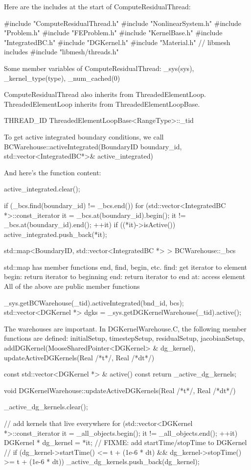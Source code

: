 Here are the includes at the start of ComputeResidualThread:

#include "ComputeResidualThread.h"
#include "NonlinearSystem.h"
#include "Problem.h"
#include "FEProblem.h"
#include "KernelBase.h"
#include "IntegratedBC.h"
#include "DGKernel.h"
#include "Material.h"
// libmesh includes
#include "libmesh/threads.h"

Some member variables of ComputeResidualThread: _sys(sys), _kernel_type(type), _num_cached(0)

ComputeResidualThread also inherits from ThreadedElementLoop. ThreadedElementLoop inherits from ThreadedElementLoopBase.

THREAD_ID ThreadedElementLoopBase<RangeType>::_tid

To get active integrated boundary conditions, we call BCWarehouse::activeIntegrated(BoundaryID boundary_id, std::vector<IntegratedBC*>& active_integrated)

And here's the function content:
{
  active_integrated.clear();

  if (_bcs.find(boundary_id) != _bcs.end())
    for (std::vector<IntegratedBC *>::const_iterator it = _bcs.at(boundary_id).begin(); it != _bcs.at(boundary_id).end(); ++it)
      if ((*it)->isActive())
        active_integrated.push_back(*it);
}

std::map<BoundaryID, std::vector<IntegratedBC *> > BCWarehouse::_bcs

std::map has member functions end, find, begin, etc.
find: get iterator to element
begin: return iterator to beginning
end: return iterator to end
at: access element
All of the above are public member functions

 _sys.getBCWarehouse(_tid).activeIntegrated(bnd_id, bcs);
std::vector<DGKernel *> dgks = _sys.getDGKernelWarehouse(_tid).active();

The warehouses are important. In DGKernelWarehouse.C, the following member functions are defined: initialSetup, timestepSetup, residualSetup, jacobianSetup, addDGKernel(MooseSharedPointer<DGKernel> & dg_kernel), updateActiveDGKernels(Real /*t*/, Real /*dt*/)

const std::vector<DGKernel *> & active() const { return _active_dg_kernels; }

void
DGKernelWarehouse::updateActiveDGKernels(Real /*t*/, Real /*dt*/)
{
  _active_dg_kernels.clear();

  // add kernels that live everywhere
  for (std::vector<DGKernel *>::const_iterator it = _all_objects.begin(); it != _all_objects.end(); ++it)
  {
    DGKernel * dg_kernel = *it;
    // FIXME: add startTime/stopTime to DGKernel
//    if (dg_kernel->startTime() <= t + (1e-6 * dt) && dg_kernel->stopTime() >= t + (1e-6 * dt))
      _active_dg_kernels.push_back(dg_kernel);
  }
}

